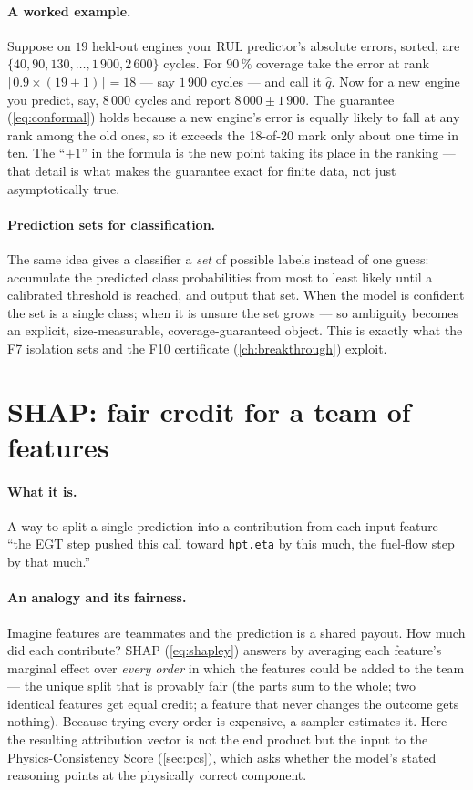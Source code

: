 \paragraph{A worked example.} Suppose on $19$ held-out engines your RUL predictor's absolute
errors, sorted, are $\{40, 90, 130, \ldots, 1\,900, 2\,600\}$ cycles. For $90\,\%$ coverage
take the error at rank $\lceil 0.9\times(19+1)\rceil = 18$ --- say $1\,900$ cycles --- and call
it $\hat{q}$. Now for a new engine you predict, say, $8\,000$ cycles and report
$8\,000 \pm 1\,900$. The guarantee (\cref{eq:conformal}) holds because a new engine's error is
equally likely to fall at any rank among the old ones, so it exceeds the 18-of-20 mark only
about one time in ten. The ``$+1$'' in the formula is the new point taking its place in the
ranking --- that detail is what makes the guarantee exact for finite data, not just
asymptotically true.

\paragraph{Prediction sets for classification.} The same idea gives a classifier a
\emph{set} of possible labels instead of one guess: accumulate the predicted class
probabilities from most to least likely until a calibrated threshold is reached, and output
that set. When the model is confident the set is a single class; when it is unsure the set
grows --- so ambiguity becomes an explicit, size-measurable, coverage-guaranteed object. This
is exactly what the F7 isolation sets and the F10 certificate (\cref{ch:breakthrough})
exploit.

\section{SHAP: fair credit for a team of features}
\label{sec:ml-shap}

\paragraph{What it is.} A way to split a single prediction into a contribution from each input
feature --- ``the EGT step pushed this call toward \texttt{hpt.eta} by this much, the
fuel-flow step by that much.''

\paragraph{An analogy and its fairness.} Imagine features are teammates and the prediction is
a shared payout. How much did each contribute? SHAP (\cref{eq:shapley}) answers by averaging
each feature's marginal effect over \emph{every order} in which the features could be added to
the team --- the unique split that is provably fair (the parts sum to the whole; two identical
features get equal credit; a feature that never changes the outcome gets nothing). Because
trying every order is expensive, a sampler estimates it. Here the resulting attribution vector
is not the end product but the input to the Physics-Consistency Score
(\cref{sec:pcs}), which asks whether the model's stated reasoning points at the physically
correct component.

